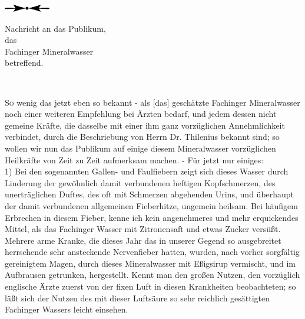 \documentclass[11pt,a5paper,twoside]{memoir}
\begin{document}
\vfill
\begin{center}
\includegraphics[width=2cm]{figures/div1}
\end{center}
\vfill

\newpage
\fancyhead[C]{=\kern-0.14em=\kern-0.14em=\kern-0.14em=\kern-0.14em= \thepage\kern+0.14em =\kern-0.14em=\kern-0.14em=\kern-0.14em=\kern-0.14em=}
{\centering
    {\Large Nachricht an das Publikum,}\\
    {\small das}\\
    \vspace{.5em}
    {\LARGE Fachinger Mineralwasser}\\
    {\small betreffend.}\\
    
    \begin{minipage}{4cm}
      \centering
      \hrulefill\\
    \end{minipage}
}

\lettrine{S}o wenig das jetzt eben so bekannt - 
als [das] geschätzte Fachinger Mineralwasser 
noch einer weiteren Empfehlung bei Ärzten bedarf, 
und jedem dessen nicht gemeine Kräfte, 
die dasselbe mit einer ihm ganz vorzüglichen Annehmlichkeit verbindet, 
durch die Beschriebung von Herrn Dr. Thilenius bekannt sind; 
so wollen wir nun das Publikum 
auf einige diesem Mineralwasser vorzüglichen Heilkräfte 
von Zeit zu Zeit aufmerksam machen. - 
Für jetzt nur einiges:\\

1) Bei den sogenannten Gallen- und Faulfiebern 
zeigt sich dieses Wasser durch Linderung 
der gewöhnlich damit verbundenen heftigen Kopfschmerzen, 
des unerträglichen Duftes, 
des oft mit Schmerzen abgehenden Urins, 
und überhaupt der damit verbundenen allgemeinen Fieberhitze, 
ungemein heilsam. 
Bei häufigem Erbrechen in diesem Fieber, 
kenne ich kein angenehmeres und mehr erquickendes Mittel, 
als das Fachinger Wasser mit Zitronensaft und etwas Zucker versüßt. 
Mehrere arme Kranke, 
die dieses Jahr das in unserer Gegend 
so ausgebreitet herrschende sehr ansteckende Nervenfieber hatten, 
wurden, nach vorher sorgfältig gereinigtem Magen, 
durch dieses Mineralwasser mit Eßigsirup vermischt, 
und im Aufbrausen getrunken, hergestellt. 
Kennt man den großen Nutzen, 
den vorzüglich englische Ärzte 
zuerst von der fixen Luft in diesen Krankheiten beobachteten; 
so läßt sich der Nutzen 
des mit dieser Luftsäure so sehr reichlich gesättigten Fachinger Wassers 
leicht einsehen.\\
\end{document}
